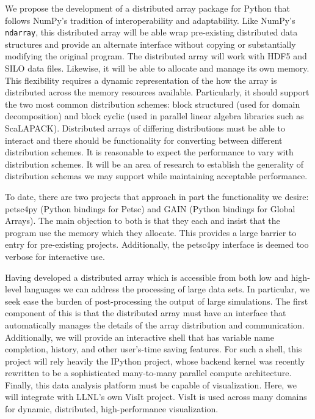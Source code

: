 \documentclass[letterpaper,12pt]{article}
\begin{document}
We propose the development of a distributed array package for Python that follows NumPy's 
tradition of interoperability and adaptability.  Like NumPy's \texttt{ndarray}, this 
distributed array will be able wrap pre-existing distributed data structures and provide 
an alternate interface without copying or substantially modifying the original program.  
The distributed array will work with HDF5\cite{HDF5} and SILO data files.  Likewise, it 
will be able to allocate and manage its own memory.  This flexibility requires a dynamic 
representation of the how the array is distributed across the memory resources available.  
Particularly, it should support the two most common distribution schemes: block structured 
(used for domain decomposition) and block cyclic (used in parallel linear algebra libraries 
such as ScaLAPACK\cite{scalapack}).  Distributed arrays of differing distributions must be 
able to interact and there should be functionality for converting between different 
distribution schemes.  It is reasonable to expect the performance to vary with distribution 
schemes.  It will be an area of research to establish the generality of distribution 
schemas we may support while maintaining acceptable performance.

To date, there are two projects that approach in part the functionality we desire: 
petsc4py\cite{petsc4py-web-page} (Python bindings for Petsc\cite{petsc-user-ref}) 
and GAIN\cite{global-arrays-python} (Python bindings for Global Arrays\cite{global-arrays}).  
The main objection to both is that they each and insist that the program use the 
memory which they allocate.  This provides a large barrier to entry for pre-existing 
projects.  Additionally, the petsc4py interface is deemed too verbose for interactive use.

Having developed a distributed array which is accessible from both low and high-level 
languages we can address the processing of large data sets.  In particular, we seek 
ease the burden of post-processing the output of large simulations. 
The first component of this is that the distributed array must have an interface that 
automatically manages the details of the array distribution and communication.  
Additionally, we will provide an interactive shell that has variable name completion, 
history, and other user's-time saving features.  For such a shell, this project will 
rely heavily the IPython project, whose backend kernel was recently rewritten to be a 
sophisticated many-to-many parallel compute architecture.  Finally, this data analysis 
platform must be capable of visualization.  Here, we will integrate with LLNL's own VisIt 
project.  VisIt is used across many domains for dynamic, distributed, 
high-performance visualization.
\end{document}
